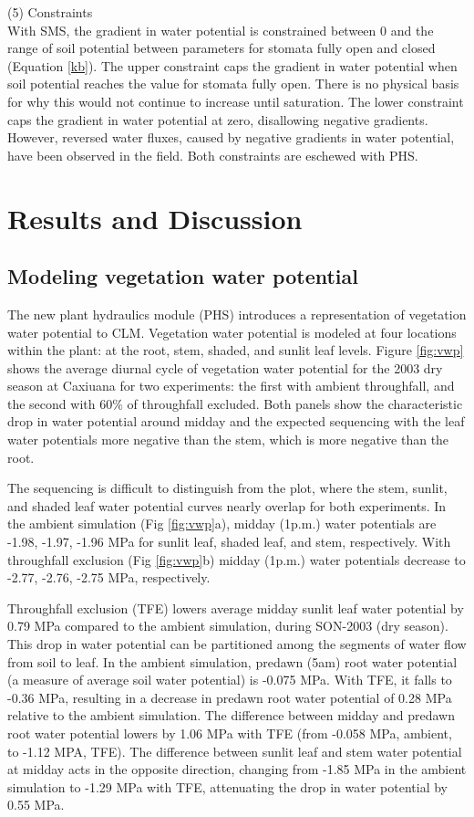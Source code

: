 \documentclass[draft,linenumbers]{agujournal}
\begin{document}
    (5) Constraints \\
    With SMS, the gradient in water potential is constrained between 0 and 
    the range of soil potential between parameters for stomata fully open and closed (Equation \ref{kb}). 
    The upper constraint caps the gradient in water potential when soil potential reaches the value for stomata fully open.
    There is no physical basis for why this would not continue to increase until saturation.
    The lower constraint caps the gradient in water potential at zero, disallowing negative gradients.
    However, reversed water fluxes, caused by negative gradients in water potential, have been observed in the field.
    Both constraints are eschewed with PHS.     
    
\section{Results and Discussion}
\subsection{Modeling vegetation water potential}

The new plant hydraulics module (PHS) introduces a representation of vegetation water potential to CLM.
Vegetation water potential is modeled at four locations within the plant: at the root, stem, shaded, and sunlit leaf levels.
Figure \ref{fig:vwp} shows the average diurnal cycle of vegetation water potential for the 2003 dry season at Caxiuana for two experiments:
the first with ambient throughfall, and the second with 60\% of throughfall excluded. 
Both panels show the characteristic drop in water potential around midday and the expected sequencing with 
the leaf water potentials more negative than the stem, which is more negative than the root.

The sequencing is difficult to distinguish from the plot, where the stem, sunlit, and shaded leaf water potential curves nearly overlap for both experiments. 
In the ambient simulation (Fig \ref{fig:vwp}a), midday (1p.m.) water potentials are -1.98, -1.97, -1.96 MPa 
for sunlit leaf, shaded leaf, and stem, respectively.
With throughfall exclusion (Fig \ref{fig:vwp}b) midday (1p.m.) water potentials decrease to -2.77, -2.76, -2.75 MPa, respectively.


Throughfall exclusion (TFE) lowers average midday sunlit leaf water potential by 0.79 MPa compared to the ambient simulation, during SON-2003 (dry season).
This drop in water potential can be partitioned among the segments of water flow from soil to leaf.
In the ambient simulation, predawn (5am) root water potential (a measure of average soil water potential) is -0.075 MPa. 
With TFE, it falls to -0.36 MPa, resulting in a decrease in predawn root water potential of 0.28 MPa relative to the ambient simulation. 
The difference between midday and predawn root water potential lowers by 1.06 MPa with TFE 
(from -0.058 MPa, ambient, to -1.12 MPA, TFE).
The difference between sunlit leaf and stem water potential at midday acts in the opposite direction, changing from
-1.85 MPa in the ambient simulation to -1.29 MPa with TFE, attenuating the drop in water potential by 0.55 MPa.
\end{document}
